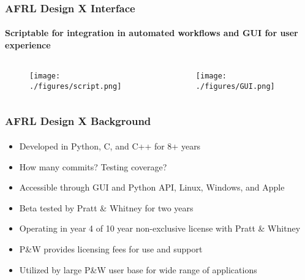 \documentclass[t]{beamer}
\begin{document}
\begin{frame}
  \frametitle{AFRL Design X Interface}
  \framesubtitle{Scriptable for integration in automated workflows and GUI for user experience}

 \begin{columns}
    \begin{column}{0.5\textwidth}
      
        \begin{figure}
          \texttt{[image: ./figures/script.png]}
          
        \end{figure}

    \end{column}
    \begin{column}{0.5\textwidth}

      \begin{figure}
       \texttt{[image: ./figures/GUI.png]}
      \end{figure}
      
    \end{column}
  \end{columns}

\end{frame}
 
\begin{frame}
  \frametitle{AFRL Design X Background}
  \framesubtitle{}

  \begin{itemize}
  \item Developed in Python, C, and C++ for 8+ years
  \item How many commits?  Testing coverage?
  \item Accessible through GUI and Python API, Linux, Windows, and Apple
  \item Beta tested by Pratt \& Whitney for two years
  \item Operating in year 4 of 10 year non-exclusive license with Pratt \& Whitney
  \item P\&W provides licensing fees for use and support
  \item Utilized by large P\&W user base for wide range of applications
  \end{itemize}

\end{frame}
\end{document}
